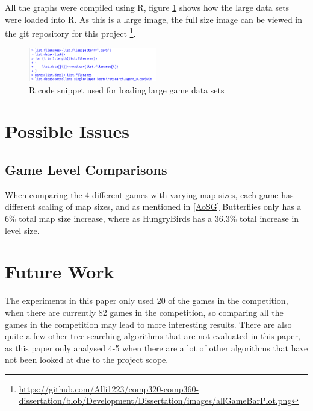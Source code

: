 \documentclass[journal]{IEEEtran}
\begin{document}
	All the graphs were compiled using R, figure \ref{fig:croppedR1} shows how the large data sets were loaded into R. As this is a large image, the full size image can be viewed in the git repository for this project \footnote{\url{https://github.com/Alli1223/comp320-comp360-dissertation/blob/Development/Dissertation/images/allGameBarPlot.png}}.

	\begin{figure}[h]
		    \centering
		    \includegraphics[width=0.5\textwidth]{croppedR1}
		    \caption{ R code snippet used for loading large game data sets }
		    \label{fig:croppedR1}
		\end{figure}












\section{Possible Issues}
	\subsection{Game Level Comparisons}
		When comparing the 4 different games with varying map sizes, each game has different scaling of map sizes, and as mentioned in \ref{AoSG} Butterflies only has a 6\% total map size increase, where as HungryBirds has a 36.3\% total increase in level size.










\section{Future Work}

The experiments in this paper only used 20 of the games in the competition, when there are currently 82 games in the competition, so comparing all the games in the competition may lead to more interesting results.
There are also quite a few other tree searching algorithms that are not evaluated in this paper, as this paper only analysed 4-5 when there are a lot of other algorithms that have not been looked at due to the project scope.
\end{document}
